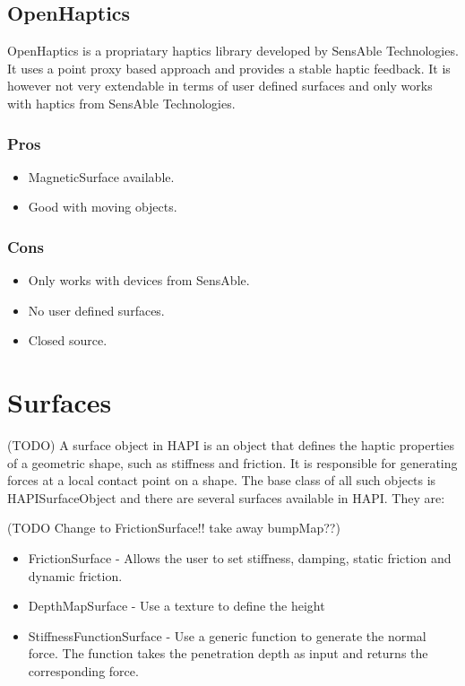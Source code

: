 \subsection{OpenHaptics}
OpenHaptics \cite{openhaptics} is a propriatary haptics library developed by SensAble Technologies. It uses a point proxy based approach and provides a stable haptic feedback. It is however not very extendable in terms of user defined surfaces and only works with haptics from SensAble Technologies.

\begin{minipage}[t]{3in}
\subsubsection{Pros}
\begin{itemize}
\item MagneticSurface available.
\item Good with moving objects.
\end{itemize}
\end{minipage}
\begin{minipage}[t]{3in}
\subsubsection{Cons}
\begin{itemize}
\item Only works with devices from SensAble.
\item No user defined surfaces.
\item Closed source.
\end{itemize}
\end{minipage}


\section{Surfaces}
(TODO)
A surface object in HAPI is an object that defines the haptic properties of a geometric shape, such as stiffness and friction. It is responsible for generating forces at a local contact point on a shape. The base class of all such objects is HAPISurfaceObject and there are several surfaces available in HAPI. They are: 

(TODO Change to FrictionSurface!! take away bumpMap??)
\begin{itemize}
\item FrictionSurface - Allows the user to set stiffness, damping, static friction and dynamic friction.
\item DepthMapSurface - Use a texture to define the height 
\item StiffnessFunctionSurface - Use a generic function to generate
  the normal force. The function takes the penetration depth as input
  and returns the corresponding force. 
\end{itemize}


